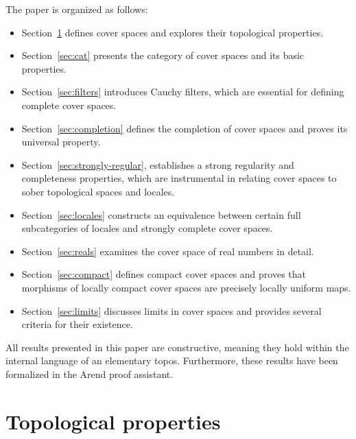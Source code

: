 \documentclass[reqno]{amsart}
\theoremstyle{definition}
\theoremstyle{remark}
\numberwithin{figure}{section}
\begin{document}
The paper is organized as follows:
\begin{itemize}
\item Section~\ref{sec:top} defines cover spaces and explores their topological properties.
\item Section~\ref{sec:cat} presents the category of cover spaces and its basic properties.
\item Section~\ref{sec:filters} introduces Cauchy filters, which are essential for defining complete cover spaces.
\item Section~\ref{sec:completion} defines the completion of cover spaces and proves its universal property.
\item Section~\ref{sec:strongly-regular}, establishes a strong regularity and completeness properties, which are instrumental in relating cover spaces to sober topological spaces and locales.
\item Section~\ref{sec:locales} constructs an equivalence between certain full subcategories of locales and strongly complete cover spaces.
\item Section~\ref{sec:reals} examines the cover space of real numbers in detail.
\item Section~\ref{sec:compact} defines compact cover spaces and proves that morphisms of locally compact cover spaces are precisely locally uniform maps.
\item Section~\ref{sec:limits} discusses limits in cover spaces and provides several criteria for their existence.
\end{itemize}

All results presented in this paper are constructive, meaning they hold within the internal language of an elementary topos.
Furthermore, these results have been formalized in the Arend proof assistant.

\section{Topological properties}
\label{sec:top}
\end{document}
